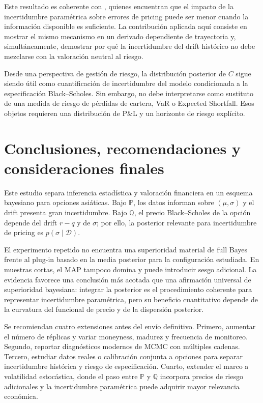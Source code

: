 \documentclass[12pt,letterpaper]{article}
\newcommand{\Pmeasure}{\mathbb{P}}
\newcommand{\Qmeasure}{\mathbb{Q}}
\begin{document}
Este resultado es coherente con \citet{romboutsstentoft2014}, quienes encuentran que el impacto de la incertidumbre paramétrica sobre errores de pricing puede ser menor cuando la información disponible es suficiente. La contribución aplicada aquí consiste en mostrar el mismo mecanismo en un derivado dependiente de trayectoria y, simultáneamente, demostrar por qué la incertidumbre del drift histórico no debe mezclarse con la valoración neutral al riesgo.

Desde una perspectiva de gestión de riesgo, la distribución posterior de $C$ sigue siendo útil como cuantificación de incertidumbre del modelo condicionada a la especificación Black--Scholes. Sin embargo, no debe interpretarse como sustituto de una medida de riesgo de pérdidas de cartera, VaR o Expected Shortfall. Esos objetos requieren una distribución de P\&L y un horizonte de riesgo explícito.

\section{Conclusiones, recomendaciones y consideraciones finales}

Este estudio separa inferencia estadística y valoración financiera en un esquema bayesiano para opciones asiáticas. Bajo $\Pmeasure$, los datos informan sobre $(\mu,\sigma)$ y el drift presenta gran incertidumbre. Bajo $\Qmeasure$, el precio Black--Scholes de la opción depende del drift $r-q$ y de $\sigma$; por ello, la posterior relevante para incertidumbre de pricing es $p(\sigma\mid\mathcal D)$.

El experimento repetido no encuentra una superioridad material de full Bayes frente al plug-in basado en la media posterior para la configuración estudiada. En muestras cortas, el MAP tampoco domina y puede introducir sesgo adicional. La evidencia favorece una conclusión más acotada que una afirmación universal de superioridad bayesiana: integrar la posterior es el procedimiento coherente para representar incertidumbre paramétrica, pero su beneficio cuantitativo depende de la curvatura del funcional de precio y de la dispersión posterior.

Se recomiendan cuatro extensiones antes del envío definitivo. Primero, aumentar el número de réplicas y variar moneyness, madurez y frecuencia de monitoreo. Segundo, reportar diagnósticos modernos de MCMC con múltiples cadenas. Tercero, estudiar datos reales o calibración conjunta a opciones para separar incertidumbre histórica y riesgo de especificación. Cuarto, extender el marco a volatilidad estocástica, donde el paso entre $\Pmeasure$ y $\Qmeasure$ incorpora precios de riesgo adicionales y la incertidumbre paramétrica puede adquirir mayor relevancia económica.
\end{document}

